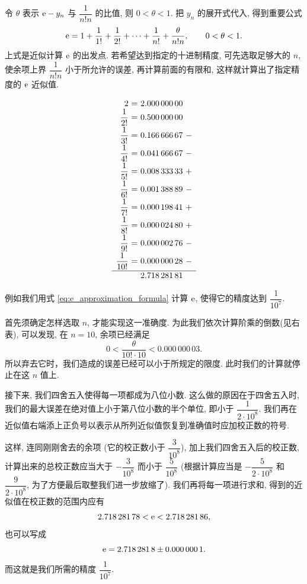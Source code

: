 令 $\theta$ 表示 $\mathrm{e}-y_n$ 与 $\dfrac1{n!n}$ 的比值, 则
$0<\theta<1$. 把 $y_n$ 的展开式代入, 得到重要公式
\begin{equation}\label{eq:e_approximation_formula}
\mathrm{e}=1+\frac1{1!}+\frac1{2!}+\cdots+\frac1{n!}
+\frac{\theta}{n!n},\qquad 0<\theta<1.
\end{equation}
上式是近似计算 $\mathrm{e}$ 的出发点.
若希望达到指定的十进制精度, 可先选取足够大的 $n$, 使余项上界
$\dfrac1{n!n}$ 小于所允许的误差, 再计算前面的有限和, 这样就计算出了指定精度的 $\mathrm{e}$ 近似值.

\begin{figure}
  \centering
  \vspace{-4em}
  \[
  \begin{array}{r@{\ }c@{\ }l@{\ }c}
  2&=&2.000\,000\,00&\\
  \dfrac1{2!}&=&0.500\,000\,00&\\[0.5em]
  \dfrac1{3!}&=&0.166\,666\,67&-\\[0.5em]
  \dfrac1{4!}&=&0.041\,666\,67&-\\[0.5em]
  \dfrac1{5!}&=&0.008\,333\,33&+\\[0.5em]
  \dfrac1{6!}&=&0.001\,388\,89&-\\[0.5em]
  \dfrac1{7!}&=&0.000\,198\,41&+\\[0.5em]
  \dfrac1{8!}&=&0.000\,024\,80&+\\[0.5em]
  \dfrac1{9!}&=&0.000\,002\,76&-\\[0.5em]
  \dfrac1{10!}&=&0.000\,000\,28&-\\[0.5em]
  \hline
  &&2.718\,281\,81&
  \end{array}
  \]
  \vspace{-1em}
\end{figure}
例如我们用式 \eqref{eq:e_approximation_formula} 计算 $\mathrm{e}$, 使得它的精度达到 $\dfrac{1}{10^7}$.

首先须确定怎样选取 $n$, 才能实现这一准确度.
为此我们依次计算阶乘的倒数(见右表),
可以发现, 在 $n=10$, 余项已经满足
$$
0<\frac{\theta}{10!\cdot10}<0.000\,000\,03.
$$
所以弃去它时，我们造成的误差已经可以小于所规定的限度.
此时我们的计算就停止在这 $n$ 值上.

接下来, 我们四舍五入使得每一项都成为八位小数.
这么做的原因在于四舍五入时, 我们的最大误差在绝对值上小于第八位小数的半个单位, 即小于 $\dfrac1{2\cdot10^8}$.
我们再在近似值右端添上正负号以表示从所列近似值恢复到准确值时应加校正数的符号.

这样, 连同刚刚舍去的余项 (它的校正数小于 $\dfrac3{10^8}$),
加上我们四舍五入后的校正数,
计算出来的总校正数应当大于 $-\dfrac3{10^8}$ 而小于 $\dfrac5{10^8}$
(根据计算应当是 $-\dfrac{5}{2\cdot10^8}$ 和 $\dfrac{9}{2\cdot10^8}$, 为了方便最后取整我们进一步放缩了).
我们再将每一项进行求和,
得到的近似值在校正数的范围内应有
$$
2.718\,281\,78<\mathrm{e}<2.718\,281\,86,
$$
也可以写成
$$
\mathrm{e}=2.718\,281\,8\mathbin{\pm}0.000\,000\,1.
$$
而这就是我们所需的精度 $\dfrac{1}{10^7}$.

